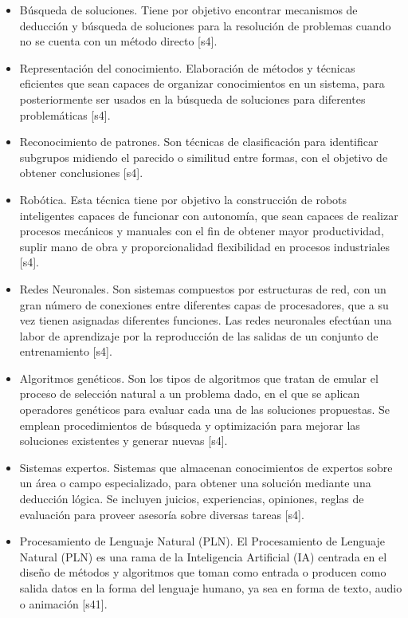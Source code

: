 \begin{itemize}
    \item Búsqueda de soluciones. Tiene por objetivo encontrar mecanismos de deducción y búsqueda de soluciones para la resolución de problemas cuando no se cuenta con un método directo [s4].\\
\item Representación del conocimiento. Elaboración de métodos y técnicas eficientes que sean capaces de organizar conocimientos en un sistema, para posteriormente ser usados en la búsqueda de soluciones para diferentes problemáticas [s4].\\
\item Reconocimiento de patrones. Son técnicas de clasificación para identificar subgrupos midiendo el parecido o similitud entre formas, con el objetivo de obtener conclusiones [s4].\\
\item Robótica. Esta técnica tiene por objetivo la construcción de robots inteligentes capaces de funcionar con autonomía, que sean capaces de realizar procesos mecánicos y manuales con el fin de obtener mayor productividad, suplir mano de obra y proporcionalidad flexibilidad en procesos industriales [s4].\\
\item Redes Neuronales. Son sistemas compuestos por estructuras de red, con un gran número de conexiones entre diferentes capas de procesadores, que a su vez tienen asignadas diferentes funciones. Las redes neuronales efectúan una labor de aprendizaje por la reproducción de las salidas de un conjunto de entrenamiento [s4].\\
\item Algoritmos genéticos. Son los tipos de algoritmos que tratan de emular el proceso de selección natural a un problema dado, en el que se aplican operadores genéticos para evaluar cada una de las soluciones propuestas. Se emplean procedimientos de búsqueda y optimización para mejorar las soluciones existentes y generar nuevas [s4].\\
\item Sistemas expertos. Sistemas que almacenan conocimientos de expertos sobre un área o campo especializado, para obtener una solución mediante una deducción lógica. Se incluyen juicios, experiencias, opiniones, reglas de evaluación para proveer asesoría sobre diversas tareas [s4]. \\
\item Procesamiento de Lenguaje Natural (PLN). El Procesamiento de Lenguaje Natural (PLN) es una rama de la Inteligencia Artificial (IA) centrada en el diseño de métodos y algoritmos que toman como entrada o producen como salida datos en la forma del lenguaje humano, ya sea en forma de texto, audio o animación [s41].

\end{itemize}

